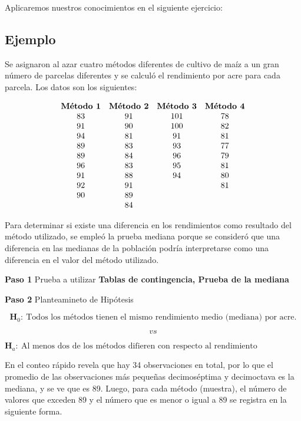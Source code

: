 \documentclass[
  a4paper,
  oneside,
  openany]{book}
\begin{document}
Aplicaremos nuestros conocimientos en el siguiente ejercicio:

\hypertarget{ejemplo-11}{%
\subsection{Ejemplo}\label{ejemplo-11}}

Se asignaron al azar cuatro métodos diferentes de cultivo de maíz a un gran número de parcelas diferentes y se calculó el rendimiento por acre para cada parcela. Los datos son los siguientes:

\[
\begin{array}{ c c c c c } 
\textbf{Método 1} & \textbf{Método 2} & \textbf{Método 3} & \textbf{Método 4} \\ 
83 & 91 &101  &78  \\ 
91 & 90 &100 &82 \\
94 & 81 &91  &81  \\
89 & 83 &93  &77  \\
89 & 84 &96  &79 \\
96 & 83 &95 &81 \\
91 & 88 &94  &80 \\
92 & 91 & & 81 \\
90 & 89 & &  \\
   & 84 &  &  \\
\end{array}
\]

Para determinar si existe una diferencia en los rendimientos como resultado del método utilizado, se empleó la prueba mediana porque se consideró que una diferencia en las medianas de la población podría interpretarse como una diferencia en el valor del método utilizado.

\textbf{Paso 1} Prueba a utilizar \textbf{Tablas de contingencia, Prueba de la mediana}

\textbf{Paso 2} Planteamineto de Hipótesis

\[\textbf{H}_0: \ \mbox{Todos los métodos tienen el mismo rendimiento medio (mediana) por acre.}\]

\[vs\]

\[\textbf{H}_a: \ \mbox{Al menos dos de los métodos difieren con respecto al rendimiento medio(mediana) por acre.}\]

En el conteo rápido revela que hay 34 observaciones en total, por lo que el promedio de las observaciones más pequeñas decimoséptima y decimoctava es la mediana, y se ve que es 89. Luego, para cada método (muestra), el número de valores que exceden 89 y el número que es menor o igual a 89 se registra en la siguiente forma.
\end{document}
